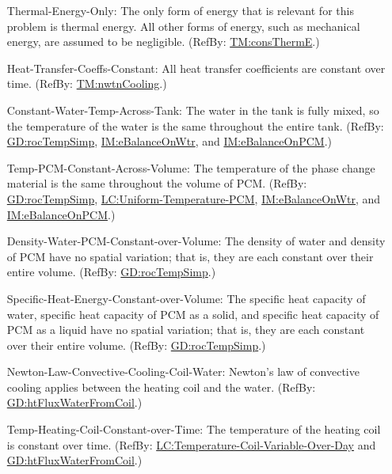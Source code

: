 \documentclass[12pt]{article}
\begin{document}
\begin{itemize}
\item[Thermal-Energy-Only:\phantomsection\label{assumpTEO}]{The only form of energy that is relevant for this problem is thermal energy. All other forms of energy, such as mechanical energy, are assumed to be negligible. (RefBy: \hyperref[TM:consThermE]{TM:consThermE}.)}
\item[Heat-Transfer-Coeffs-Constant:\phantomsection\label{assumpHTCC}]{All heat transfer coefficients are constant over time. (RefBy: \hyperref[TM:nwtnCooling]{TM:nwtnCooling}.)}
\item[Constant-Water-Temp-Across-Tank:\phantomsection\label{assumpCWTAT}]{The water in the tank is fully mixed, so the temperature of the water is the same throughout the entire tank. (RefBy: \hyperref[GD:rocTempSimp]{GD:rocTempSimp}, \hyperref[IM:eBalanceOnWtr]{IM:eBalanceOnWtr}, and \hyperref[IM:eBalanceOnPCM]{IM:eBalanceOnPCM}.)}
\item[Temp-PCM-Constant-Across-Volume:\phantomsection\label{assumpTPCAV}]{The temperature of the phase change material is the same throughout the volume of PCM. (RefBy: \hyperref[GD:rocTempSimp]{GD:rocTempSimp}, \hyperref[likeChgUTP]{LC:Uniform-Temperature-PCM}, \hyperref[IM:eBalanceOnWtr]{IM:eBalanceOnWtr}, and \hyperref[IM:eBalanceOnPCM]{IM:eBalanceOnPCM}.)}
\item[Density-Water-PCM-Constant-over-Volume:\phantomsection\label{assumpDWPCoV}]{The density of water and density of PCM have no spatial variation; that is, they are each constant over their entire volume. (RefBy: \hyperref[GD:rocTempSimp]{GD:rocTempSimp}.)}
\item[Specific-Heat-Energy-Constant-over-Volume:\phantomsection\label{assumpSHECov}]{The specific heat capacity of water, specific heat capacity of PCM as a solid, and specific heat capacity of PCM as a liquid have no spatial variation; that is, they are each constant over their entire volume. (RefBy: \hyperref[GD:rocTempSimp]{GD:rocTempSimp}.)}
\item[Newton-Law-Convective-Cooling-Coil-Water:\phantomsection\label{assumpLCCCW}]{Newton's law of convective cooling applies between the heating coil and the water. (RefBy: \hyperref[GD:htFluxWaterFromCoil]{GD:htFluxWaterFromCoil}.)}
\item[Temp-Heating-Coil-Constant-over-Time:\phantomsection\label{assumpTHCCoT}]{The temperature of the heating coil is constant over time. (RefBy: \hyperref[likeChgTCVOD]{LC:Temperature-Coil-Variable-Over-Day} and \hyperref[GD:htFluxWaterFromCoil]{GD:htFluxWaterFromCoil}.)}

\end{itemize}
\end{document}
